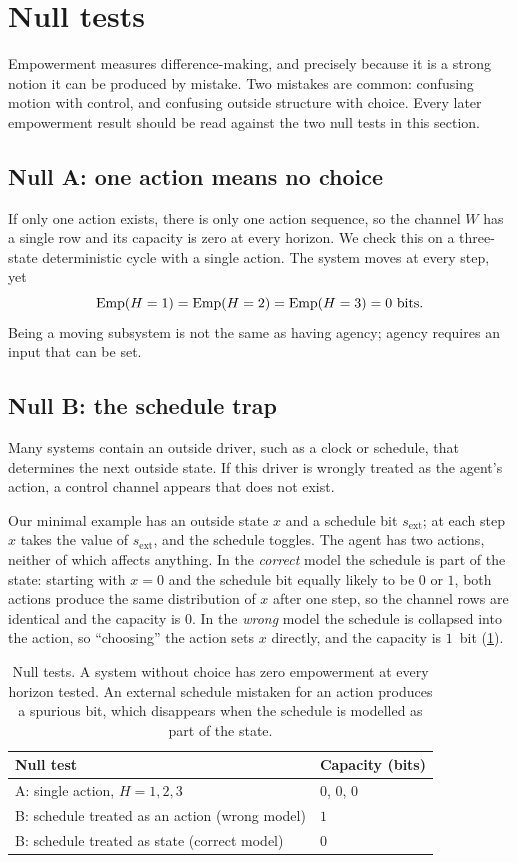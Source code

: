 \section{Null tests}
\label{sec:ex_nulls}

Empowerment measures difference-making, and precisely because it is a strong notion it can be produced by mistake. Two mistakes are common: confusing motion with control, and confusing outside structure with choice. Every later empowerment result should be read against the two null tests in this section.

\subsection{Null A: one action means no choice}
If only one action exists, there is only one action sequence, so the channel $W$ has a single row and its capacity is zero at every horizon. We check this on a three-state deterministic cycle with a single action. The system moves at every step, yet
\[
\mathrm{Emp}(H=1)=\mathrm{Emp}(H=2)=\mathrm{Emp}(H=3)=0 \text{ bits}.
\]
Being a moving subsystem is not the same as having agency; agency requires an input that can be set.

\subsection{Null B: the schedule trap}
Many systems contain an outside driver, such as a clock or schedule, that determines the next outside state. If this driver is wrongly treated as the agent's action, a control channel appears that does not exist.

Our minimal example has an outside state $x$ and a schedule bit $s_{\mathrm{ext}}$; at each step $x$ takes the value of $s_{\mathrm{ext}}$, and the schedule toggles. The agent has two actions, neither of which affects anything. In the \emph{correct} model the schedule is part of the state: starting with $x=0$ and the schedule bit equally likely to be $0$ or $1$, both actions produce the same distribution of $x$ after one step, so the channel rows are identical and the capacity is $0$. In the \emph{wrong} model the schedule is collapsed into the action, so ``choosing'' the action sets $x$ directly, and the capacity is $1$~bit (\cref{tab:nulls}).

\begin{table}[t]
\centering
\small
\begin{tabular}{@{}ll@{}}
\toprule
\textbf{Null test} & \textbf{Capacity (bits)} \\
\midrule
A: single action, $H=1,2,3$ & $0$, $0$, $0$ \\
B: schedule treated as an action (wrong model) & $1$ \\
B: schedule treated as state (correct model) & $0$ \\
\bottomrule
\end{tabular}
\caption{Null tests. A system without choice has zero empowerment at every horizon tested. An external schedule mistaken for an action produces a spurious bit, which disappears when the schedule is modelled as part of the state.}
\label{tab:nulls}
\end{table}

